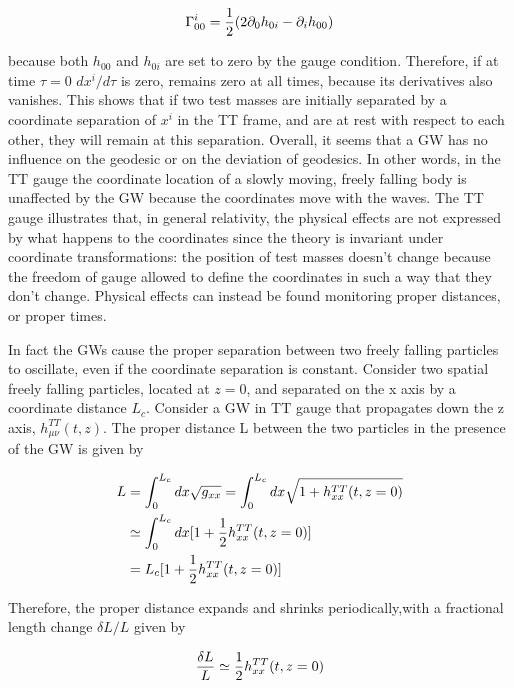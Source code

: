 \documentclass[binding=0.6cm, LaM]{sapthesis}
\begin{document}
		\begin{equation}
		\Gamma^i_{00} = {1 \over {2}}(2\partial_{0}h_{0i} - \partial_i h_{00})
		\end{equation}

	because both $h_{00}$ and $h_{0i}$ are set to zero by the gauge condition. 
	Therefore, if at time $\tau = 0$ $dx^i/d\tau$ is zero, remains zero at all times, 
	because its derivatives also vanishes.
	This shows that if two test masses are initially separated by a coordinate separation of $x^i$ in the TT frame, 
	and are at rest with respect to each other, they will remain at this separation.
	Overall, it seems that a GW has no influence on the geodesic or on the deviation of geodesics.
	In other words, in the TT gauge the coordinate location of a slowly moving, freely falling body is unaffected 
	by the GW because the coordinates move with the waves.
	The TT gauge illustrates that, in general relativity, the physical effects are not expressed by what happens 
	to the coordinates since the theory is invariant under coordinate transformations:
	the position of test masses doesn't change because the freedom of gauge allowed to define the coordinates 
	in such a way that they don't change.
	Physical effects can instead be found monitoring proper distances, or proper times.

	In fact the GWs cause the proper separation between two freely falling particles to oscillate, 
	even if the coordinate separation is constant. Consider two spatial freely falling particles, 
	located at $z = 0$, and separated on the x axis by a coordinate distance $L_c$. 
	Consider a GW in TT gauge that propagates down the z axis, $h^{TT}_{\mu\nu}(t,z)$. 
	The proper distance L between the two particles in the presence of the GW is given by

		\begin{align}
		L & = \int^{L_c}_{0}{dx\sqrt{g_{xx}}} = \int^{L_c}_{0}dx\sqrt{1 + h^{TT}_{xx}(t,z=0)} \\
		& \simeq \int^{L_c}_{0}{dx[1 + {1 \over 2}h^{TT}_{xx}(t,z=0)]} \\
		&= L_c[1 + {1 \over 2}h^{TT}_{xx}(t,z=0)]
		\end{align}

	Therefore, the proper distance expands and shrinks periodically,with a fractional length change $\delta L/L$ given by

		\begin{equation}
		{{\delta L}\over{L}} \simeq {1 \over 2} h_{xx}^{TT}(t,z=0)
		\end{equation}
\end{document}
